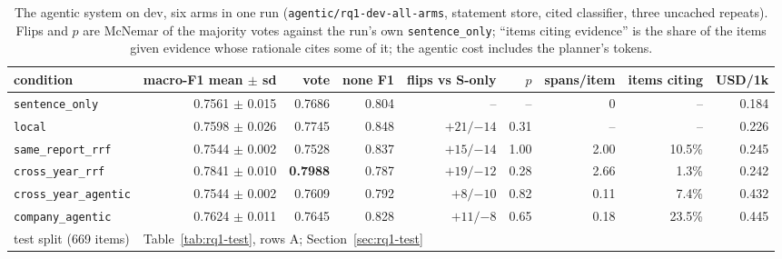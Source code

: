 \documentclass[11pt]{article}
\newcommand{\cond}[1]{\texttt{#1}}
\newcommand{\run}[1]{\nolinkurl{#1}}
\begin{document}
\begin{table}[!htbp]
\centering\footnotesize
\setlength{\tabcolsep}{3pt}
\begin{tabular*}{\linewidth}{@{}@{\extracolsep{\fill}}lrrrrrrrr@{}}
\toprule
condition & macro-F1 mean $\pm$ sd & vote & none F1 & flips vs S-only & $p$ & spans/item & items citing & USD/1k \\
\midrule
\cond{sentence\_only} & 0.7561 $\pm$ 0.015 & 0.7686 & 0.804 & -- & -- & 0 & -- & 0.184 \\
\cond{local} & 0.7598 $\pm$ 0.026 & 0.7745 & 0.848 & $+21 / {-14}$ & 0.31 & -- & -- & 0.226 \\
\cond{same\_report\_rrf} & 0.7544 $\pm$ 0.002 & 0.7528 & 0.837 & $+15 / {-14}$ & 1.00 & 2.00 & 10.5\% & 0.245 \\
\cond{cross\_year\_rrf} & 0.7841 $\pm$ 0.010 & \textbf{0.7988} & 0.787 & $+19 / {-12}$ & 0.28 & 2.66 & 1.3\% & 0.242 \\
\cond{cross\_year\_agentic} & 0.7544 $\pm$ 0.002 & 0.7609 & 0.792 & $+8 / {-10}$ & 0.82 & 0.11 & 7.4\% & 0.432 \\
\cond{company\_agentic} & 0.7624 $\pm$ 0.011 & 0.7645 & 0.828 & $+11 / {-8}$ & 0.65 & 0.18 & 23.5\% & 0.445 \\
\midrule
test split (669 items) & \multicolumn{8}{l}{Table~\ref{tab:rq1-test}, rows A; Section~\ref{sec:rq1-test}} \\
\bottomrule
\end{tabular*}
\caption{The agentic system on dev, six arms in one run (\run{agentic/rq1-dev-all-arms}, statement store, cited classifier, three uncached repeats). Flips and $p$ are McNemar of the majority votes against the run's own \cond{sentence\_only}; ``items citing evidence'' is the share of the items given evidence whose rationale cites some of it; the agentic cost includes the planner's tokens.}
\label{tab:rq1-agentic}
\end{table}
\end{document}
